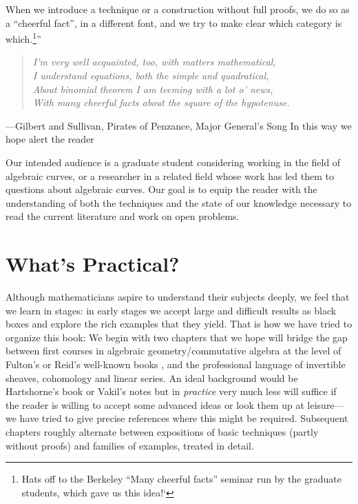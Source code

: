 When we introduce a technique or a construction without full proofs, we do so as a ``cheerful fact'', in a different font, 
and we try to make clear which category is which.\footnote{Hats off to the Berkeley ``Many cheerful facts'' seminar run
by the graduate students, which gave us this idea!`}''

\begin{quote}\it{I'm very well acquainted, too, with matters mathematical,\\
I understand equations, both the simple and quadratical,\\
About binomial theorem I am teeming with a lot o' news,\\
With many cheerful facts about the square of the hypotenuse.}
\end{quote}
---Gilbert and Sullivan, Pirates of Penzance, Major General's Song
In this way we hope alert the reader

Our intended audience is a graduate student considering working in the field of algebraic curves, or a researcher in a related field whose work has led them to questions about algebraic curves. Our goal is to equip the reader with the understanding of both the techniques and the state of our knowledge necessary to read the current literature and work on open problems.

\section{What's Practical?}

Although mathematicians aspire to understand their subjects deeply, we feel that we learn in stages: in early stages we accept large and difficult results as black boxes and explore the rich examples that they yield. That is how we have tried to organize this book: 
We begin with two chapters that we hope will bridge the gap between first courses in algebraic geometry/commutative algebra at the level of Fulton's or  Reid's well-known books \cite{Fulton1989}, \cite{MR982494} and the professional language of invertible sheaves, cohomology and linear series. An ideal background would
be Hartshorne's book \cite{Hartshorne1977} or Vakil's notes \cite{Vakil-notes} but in \emph{practice} very much less will suffice if the reader is willing to accept some advanced ideas or look them up at leisure---we have tried to give precise references where this might be required. Subsequent chapters roughly alternate between expositions of basic techniques (partly without proofs) and families of examples, treated in detail. 

